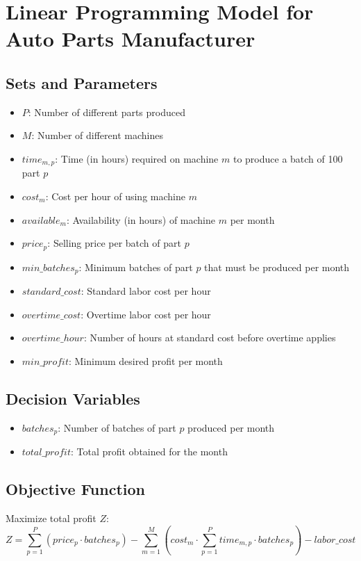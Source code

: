 \documentclass{article}
\begin{document}
\section*{Linear Programming Model for Auto Parts Manufacturer}

\subsection*{Sets and Parameters}
\begin{itemize}
    \item $P$: Number of different parts produced
    \item $M$: Number of different machines
    \item $time_{m,p}$: Time (in hours) required on machine $m$ to produce a batch of 100 part $p$
    \item $cost_{m}$: Cost per hour of using machine $m$
    \item $available_{m}$: Availability (in hours) of machine $m$ per month
    \item $price_{p}$: Selling price per batch of part $p$
    \item $min\_batches_{p}$: Minimum batches of part $p$ that must be produced per month
    \item $standard\_cost$: Standard labor cost per hour
    \item $overtime\_cost$: Overtime labor cost per hour
    \item $overtime\_hour$: Number of hours at standard cost before overtime applies
    \item $min\_profit$: Minimum desired profit per month
\end{itemize}

\subsection*{Decision Variables}
\begin{itemize}
    \item $batches_{p}$: Number of batches of part $p$ produced per month
    \item $total\_profit$: Total profit obtained for the month
\end{itemize}

\subsection*{Objective Function}
Maximize total profit $Z$:
\[
Z = \sum_{p=1}^{P} (price_{p} \cdot batches_{p}) - \sum_{m=1}^{M} (cost_{m} \cdot \sum_{p=1}^{P} time_{m,p} \cdot batches_{p}) - labor\_cost
\]
\end{document}
